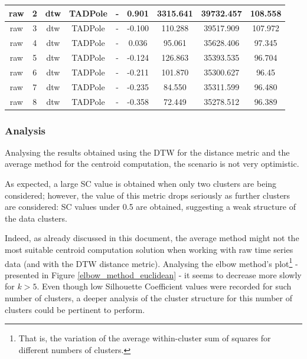 \documentclass[9pt,journal,compsoc]{IEEEtran}
\begin{document}
\begin{table}[t]
\begin{tabular}{|c|c|c|c|c|c|c|c|c|}
      	raw & 2 & dtw & TADPole & - & 0.901 & 3315.641 & 39732.457 & 108.558 \\ \hline
        raw & 3 & dtw & TADPole & - & -0.100 & 110.288 & 39517.909 & 107.972 \\ \hline
        raw & 4 & dtw & TADPole & - & 0.036 & 95.061 & 35628.406 & 97.345 \\ \hline
        raw & 5 & dtw & TADPole & - & -0.124 & 126.863 & 35393.535 & 96.704 \\ \hline
        raw & 6 & dtw & TADPole & - & -0.211 & 101.870 & 35300.627 & 96.45 \\ \hline
        raw & 7 & dtw & TADPole & - & -0.235 & 84.550 & 35311.599 & 96.480 \\ \hline
        raw & 8 & dtw & TADPole & - & -0.358 & 72.449 & 35278.512 & 96.389 \\ \hline
	\end{tabular}
\end{table}

\subsubsection{Analysis}

Analysing the results obtained using the DTW for the distance metric and the average method for the centroid computation, the scenario is not very optimistic.

As expected, a large SC value is obtained when only two clusters are being considered; however, the value of this metric drops seriously as further clusters are considered: SC values under 0.5 are obtained, suggesting a weak structure of the data clusters.

Indeed, as already discussed in this document, the average method might not the most suitable centroid computation solution when working with raw time series data (and with the DTW distance metric). Analysing the elbow method's plot\footnote{That is, the variation of the average within-cluster sum of squares for different numbers of clusters.} - presented in Figure \ref{elbow_method_euclidean} - it seems to decrease more slowly for $k > 5$. Even though low Silhouette Coefficient values were recorded for such number of clusters, a deeper analysis of the cluster structure for this number of clusters could be pertinent to perform.
\end{document}
